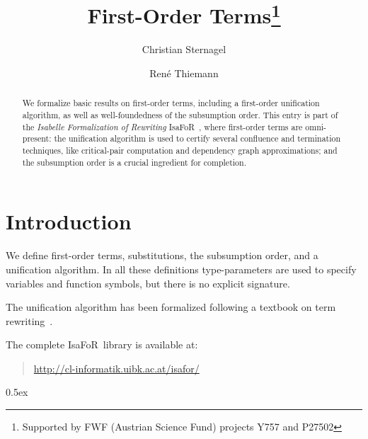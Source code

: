 \documentclass[11pt,a4paper]{article}
\newcommand\isafor{\textsf{IsaFoR}}
\begin{document}
\title{First-Order Terms\footnote{Supported by FWF (Austrian Science Fund) projects Y757 and P27502}}
\author{Christian Sternagel \and Ren\'e Thiemann}
\maketitle


\begin{abstract}
We formalize basic results on first-order terms, including a first-order unification algorithm,
as well as well-foundedness of the subsumption order. 
This entry is part of the \emph{Isabelle Formalization of Rewriting} \isafor~\cite{isafor},
where first-order terms are omni-present: the unification algorithm 
is used to certify several confluence and termination techniques, like
critical-pair computation and dependency graph approximations; and the subsumption order
is a crucial ingredient for completion.
\end{abstract}

\tableofcontents

\section{Introduction}

We define first-order terms, substitutions, the subsumption order, and a unification algorithm.
In all these definitions type-parameters are used to specify variables
and function symbols, but there is no explicit signature. 

The unification algorithm has been formalized following a textbook on term rewriting~\cite{AllThat}.

The complete \isafor\ library is available at:
\begin{quote}
\url{http://cl-informatik.uibk.ac.at/isafor/}
\end{quote}

\parindent 0pt\parskip 0.5ex





\end{document}
